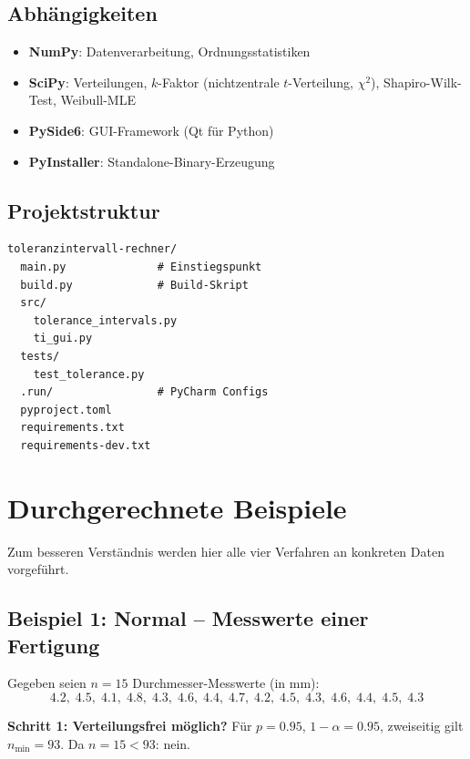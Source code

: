 \documentclass[10pt,a4paper,twocolumn]{article}
\theoremstyle{definition}
\begin{document}
\subsection{Abhängigkeiten}

\begin{itemize}[nosep,leftmargin=*]
    \item \textbf{NumPy}: Datenverarbeitung, Ordnungsstatistiken
    \item \textbf{SciPy}: Verteilungen, $k$-Faktor (nichtzentrale
          $t$-Verteilung, $\chi^2$), Shapiro-Wilk-Test,
          Weibull-MLE
    \item \textbf{PySide6}: GUI-Framework (Qt für Python)
    \item \textbf{PyInstaller}: Standalone-Binary-Erzeugung
\end{itemize}

\subsection{Projektstruktur}

\begin{verbatim}
toleranzintervall-rechner/
  main.py              # Einstiegspunkt
  build.py             # Build-Skript
  src/
    tolerance_intervals.py
    ti_gui.py
  tests/
    test_tolerance.py
  .run/                # PyCharm Configs
  pyproject.toml
  requirements.txt
  requirements-dev.txt
\end{verbatim}


\section{Durchgerechnete Beispiele}
\label{sec:beispiele}

Zum besseren Verständnis werden hier alle vier Verfahren an
konkreten Daten vorgeführt.

\subsection{Beispiel 1: Normal -- Messwerte einer Fertigung}

Gegeben seien $n = 15$ Durchmesser-Messwerte (in mm):
\[
    4.2,\; 4.5,\; 4.1,\; 4.8,\; 4.3,\; 4.6,\; 4.4,\; 4.7,\;
    4.2,\; 4.5,\; 4.3,\; 4.6,\; 4.4,\; 4.5,\; 4.3
\]

\textbf{Schritt 1: Verteilungsfrei möglich?}
Für $p = 0.95$, $1-\alpha = 0.95$, zweiseitig gilt
$n_{\min} = 93$. Da $n = 15 < 93$: nein.
\end{document}

